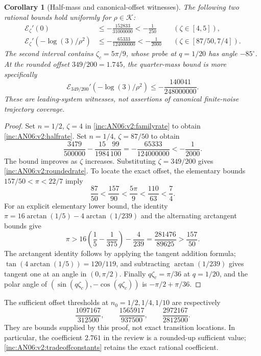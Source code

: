 \documentclass[11pt]{article}
\numberwithin{equation}{section}
\newtheorem{corollary}[theorem]{Corollary}
\theoremstyle{remark}\newtheorem{remark}[theorem]{Remark}
\newcommand{\1}{\mathbf 1}
\begin{document}
\begin{corollary}[Half-mass and canonical-offset witnesses]
\label{inc:AN06:v2:halfdescenttheorem}
The following two rational bounds hold uniformly for $\rho\in\mathcal K$:
\begin{align}
 \mathcal E_\zeta'(0)&\le-\frac{152833}{31000000}<-\frac1{250}
       &&(\zeta\in[4,5]),
       \label{inc:AN06:v2:halfrate}\\
 \mathcal E_\zeta'(-\log(3)/\rho^2)
       &\le-\frac{65333}{124000000}<-\frac1{2000}
       &&(\zeta\in[87/50,7/4]).
       \label{inc:AN06:v2:quarterrate}
\end{align}
The second interval contains $\zeta_c=5\pi/9$, whose probe at $q=1/20$
has angle $-85^\circ$. At the rounded offset $349/200=1.745$, the
quarter-mass bound is more specifically
\begin{equation}\label{inc:AN06:v2:roundedrate}
 \mathcal E_{349/200}'(-\log(3)/\rho^2)
 \le-\frac{140041}{248000000}.
\end{equation}
These are leading-system witnesses, not assertions of canonical
finite-noise trajectory coverage.
\end{corollary}
\begin{proof}
Set $n=1/2$, $\zeta=4$ in \eqref{inc:AN06:v2:familyrate} to obtain
\eqref{inc:AN06:v2:halfrate}. Set $n=1/4$, $\zeta=87/50$ to obtain
\[
 \frac{3479}{500000}-\frac{15}{1984}\frac{99}{100}
 =-\frac{65333}{124000000}<-\frac1{2000}.
\]
The bound improves as $\zeta$ increases. Substituting $\zeta=349/200$
gives \eqref{inc:AN06:v2:roundedrate}.
To locate the exact offset, the elementary bounds
$157/50<\pi<22/7$ imply
\[
 \frac{87}{50}<\frac{157}{90}<\frac{5\pi}{9}
 <\frac{110}{63}<\frac74.
\]
For an explicit elementary lower bound, the identity
$\pi=16\arctan(1/5)-4\arctan(1/239)$ and the alternating arctangent
bounds give
\[
 \pi>16\left(\frac15-\frac1{375}\right)-\frac4{239}
 =\frac{281476}{89625}>\frac{157}{50}.
\]
The arctangent identity follows by applying the tangent addition formula;
$\tan(4\arctan(1/5))=120/119$, and subtracting $\arctan(1/239)$ gives
tangent one at an angle in $(0,\pi/2)$.
Finally $q\zeta_c=\pi/36$ at $q=1/20$, and the polar angle of
$(\sin(q\zeta_c),-\cos(q\zeta_c))$ is $-\pi/2+\pi/36$.
\end{proof}

The sufficient offset thresholds at $n_0=1/2,1/4,1/10$ are respectively
\[
 \frac{1097167}{312500},\qquad
 \frac{1565917}{937500},\qquad
 \frac{2972167}{2812500}.
\]
They are bounds supplied by this proof, not exact transition locations.
In particular, the coefficient $2.761$ in the review is a rounded-up
sufficient value; \eqref{inc:AN06:v2:tradeoffconstants} retains the exact
rational coefficient.
\end{document}
